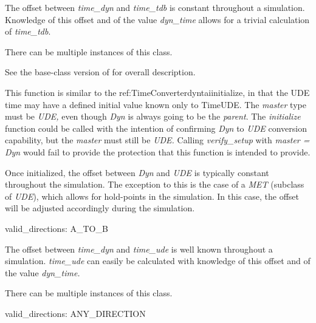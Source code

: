 {\begin{enumerate}
{\begin{enumerate}
The offset between \textit{time\_dyn} and
\textit{time\_tdb} is constant throughout a simulation. 
Knowledge of this
offset and of the value \textit{dyn\_time} allows for a trivial calculation of
\textit{time\_tdb}.




\end{enumerate}}



There can be multiple instances of this class.

{\begin{enumerate}
See the base-class version of 
 for overall description.

This function is similar to the 
{ref:TimeConverterdyntaiinitialize},
in that the UDE time may have a defined initial value known only to
TimeUDE.  The \textit{master} type must be \textit{UDE, }even though
\textit{Dyn} is always going to be the \textit{parent}.  The
\textit{initialize} function could be called with the intention of
confirming \textit{Dyn} to \textit{UDE} conversion capability, but the
\textit{master} must still be \textit{UDE.  }Calling
\textit{verify\_setup} with\textit{ master = Dyn }would fail to provide
the protection that this function is intended to provide.

Once initialized, the offset between \textit{Dyn} and \textit{UDE} is
typically constant throughout the simulation.  The exception to this is
the case of a \textit{MET }(subclass of \textit{UDE}), which allows
for hold-points in the simulation.  In this case, the offset will be
adjusted accordingly during the simulation.

valid\_directions:
A\_TO\_B

The offset between \textit{time\_dyn }and
\textit{time\_ude }is well known throughout a simulation. 
\textit{time\_ude} can easily be calculated with knowledge of this
offset and of the value \textit{dyn\_time.}

\end{enumerate}}


There can be multiple instances of this class.

{\begin{enumerate}
valid\_directions:
ANY\_DIRECTION


\end{enumerate}}
\end{enumerate}}

